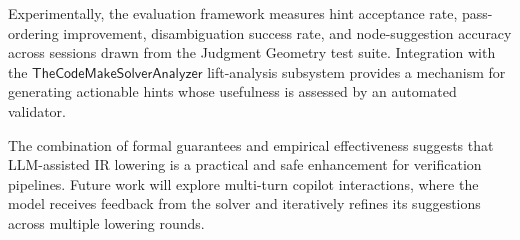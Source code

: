 \documentclass[11pt]{article}
\newcommand{\TCA}{\mathsf{TheCodeMakeSolverAnalyzer}}
\begin{document}
Experimentally, the evaluation framework measures hint acceptance
rate, pass-ordering improvement, disambiguation success rate, and
node-suggestion accuracy across sessions drawn from the Judgment
Geometry test suite.  Integration with
the $\TCA$ lift-analysis subsystem provides a mechanism for generating
actionable hints whose usefulness is assessed by an automated validator.

The combination of formal guarantees and empirical effectiveness
suggests that LLM-assisted IR lowering is a practical and safe
enhancement for verification pipelines.  Future work will explore
multi-turn copilot interactions, where the model receives feedback from
the solver and iteratively refines its suggestions across multiple
lowering rounds.

\end{document}
